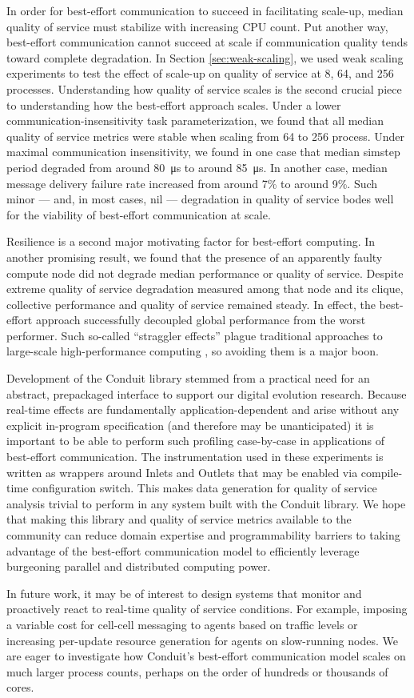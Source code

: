 In order for best-effort communication to succeed in facilitating scale-up, median quality of service must stabilize with increasing CPU count.
Put another way, best-effort communication cannot succeed at scale if communication quality tends toward complete degradation.
In Section \ref{sec:weak-scaling}, we used weak scaling experiments to test the effect of scale-up on quality of service at 8, 64, and 256 processes.
Understanding how quality of service scales is the second crucial piece  to understanding how the best-effort approach scales.
Under a lower communication-insensitivity task parameterization, we found that all median quality of service metrics were stable when scaling from 64 to 256 process.
Under maximal communication insensitivity, we found in one case that median simstep period degraded from around \SI{80}{\micro\second} to around \SI{85}{\micro\second}.
In another case, median message delivery failure rate increased from around 7\% to around 9\%.
Such minor --- and, in most cases, nil --- degradation in quality of service bodes well for the viability of best-effort communication at scale.

Resilience is a second major motivating factor for best-effort computing.
In another promising result, we found that the presence of an apparently faulty compute node did not degrade median performance or quality of service.
Despite extreme quality of service degradation measured among that node and its clique, collective performance and quality of service remained steady.
In effect, the best-effort approach successfully decoupled global performance from the worst performer.
Such so-called ``straggler effects'' plague traditional approaches to large-scale high-performance computing \citep{aktacs2019straggler}, so avoiding them is a major boon.

Development of the Conduit library stemmed from a practical need for an abstract, prepackaged interface to support our digital evolution research.
Because real-time effects are fundamentally application-dependent and arise without any explicit in-program specification (and therefore may be unanticipated) it is important to be able to perform such profiling case-by-case in applications of best-effort communication.
The instrumentation used in these experiments is written as wrappers around Inlets and Outlets that may be enabled via compile-time configuration switch.
This makes data generation for quality of service analysis trivial to perform in any system built with the Conduit library.
We hope that making this library and quality of service metrics available to the community can reduce domain expertise and programmability barriers to taking advantage of the best-effort communication model to efficiently leverage burgeoning parallel and distributed computing power.

In future work, it may be of interest to design systems that monitor and proactively react to real-time quality of service conditions.
For example, imposing a variable cost for cell-cell messaging to agents based on traffic levels or increasing per-update resource generation for agents on slow-running nodes.
We are eager to investigate how Conduit's best-effort communication model scales on much larger process counts, perhaps on the order of hundreds or thousands of cores.
